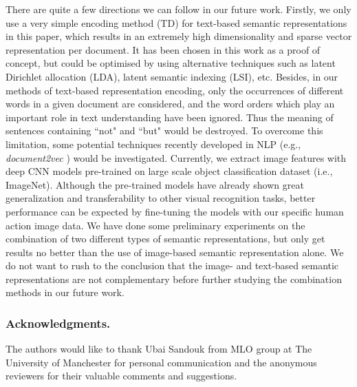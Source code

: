 \documentclass[runningheads,a4paper] {llncs}
\begin{document}
There are quite a few directions we can follow in our future work. Firstly, we only use a very simple encoding method (TD) for text-based semantic representations in this paper, which results in an extremely high dimensionality and sparse vector representation per document. It has been chosen in this work as a proof of concept, but could be optimised by using alternative techniques such as latent Dirichlet allocation (LDA), latent semantic indexing (LSI), etc. Besides, in our methods of text-based representation encoding, only the occurrences of different words in a given document are considered, and the word orders which play an important role in text understanding have been ignored. Thus the meaning of sentences containing ``not" and ``but" would be destroyed. To overcome this limitation, some potential techniques recently developed in NLP (e.g., \textit{document2vec} \cite{le2014distributed}) would be investigated. Currently, we extract image features with deep CNN models pre-trained on large scale object classification dataset (i.e., ImageNet). Although the pre-trained models have already shown great generalization and transferability to other visual recognition tasks, better performance can be expected by fine-tuning the models with our specific human action image data. We have done some preliminary experiments on the combination of two different types of semantic representations, but only get results no better than the use of image-based semantic representation alone. We do not want to rush to the conclusion that the image- and text-based semantic representations are not complementary before further studying the combination methods in our future work.
\subsubsection*{Acknowledgments.} The authors would like to thank Ubai Sandouk from MLO group at The University of Manchester for personal communication and the anonymous reviewers for their valuable comments and suggestions.



\end{document}
